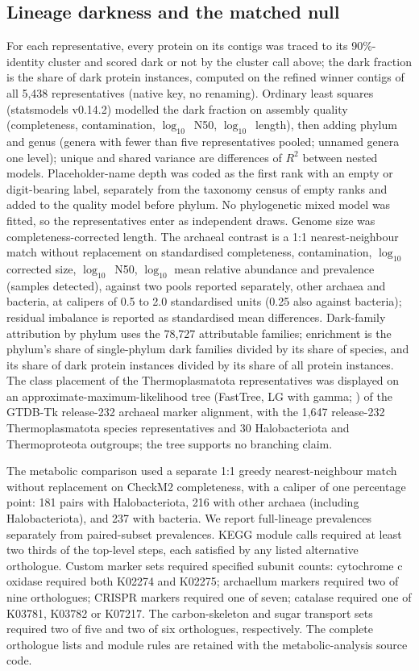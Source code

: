 \documentclass[11pt]{article}
\begin{document}
\subsection*{Lineage darkness and the matched null}
For each representative, every protein on its contigs was traced to its 90\%-identity cluster and
scored dark or not by the cluster call above; the dark fraction is the share of dark protein
instances, computed on the refined winner contigs of all 5{,}438 representatives (native key, no
renaming). Ordinary least squares (statsmodels v0.14.2) modelled the dark fraction on assembly quality
(completeness, contamination, $\log_{10}$~N50, $\log_{10}$~length), then adding phylum and genus
(genera with fewer than five representatives pooled; unnamed genera one level); unique and shared
variance are differences of $R^2$ between nested models. Placeholder-name depth was coded as the first rank with an empty or digit-bearing label, separately from the taxonomy census of empty ranks and added to the quality model before phylum. No
phylogenetic mixed model was fitted, so the representatives enter as independent draws. Genome size
was completeness-corrected length. The archaeal contrast is a 1:1 nearest-neighbour match without
replacement on standardised completeness, contamination, $\log_{10}$ corrected size,
$\log_{10}$~N50, $\log_{10}$ mean relative abundance and prevalence (samples detected), against two
pools reported separately, other archaea and bacteria, at calipers of 0.5 to 2.0 standardised units
(0.25 also against bacteria); residual imbalance is reported as standardised mean differences. Dark-family attribution by
phylum uses the 78{,}727 attributable families; enrichment is the phylum's share of single-phylum
dark families divided by its share of species, and its share of dark protein instances divided by
its share of all protein instances. The class placement of the Thermoplasmatota representatives was
displayed on an approximate-maximum-likelihood tree (FastTree, LG with gamma; \citep{price2010fasttree}) of the GTDB-Tk
release-232 archaeal marker alignment, with the 1{,}647 release-232 Thermoplasmatota species
representatives and 30 Halobacteriota and Thermoproteota outgroups; the tree supports no branching
claim.

The metabolic comparison used a separate 1:1 greedy nearest-neighbour match without replacement
on CheckM2 completeness, with a caliper of one percentage point: 181 pairs with Halobacteriota,
216 with other archaea (including Halobacteriota), and 237 with bacteria. We report full-lineage
prevalences separately from paired-subset prevalences. KEGG module calls required at least
two thirds of the top-level steps, each satisfied by any listed alternative orthologue.
Custom marker sets required specified subunit counts: cytochrome c oxidase required both
K02274 and K02275; archaellum markers required two of nine orthologues; CRISPR markers required
one of seven; catalase required one of K03781, K03782 or K07217. The carbon-skeleton and sugar
transport sets required two of five and two of six orthologues, respectively. The complete
orthologue lists and module rules are retained with the metabolic-analysis source code.
\end{document}
